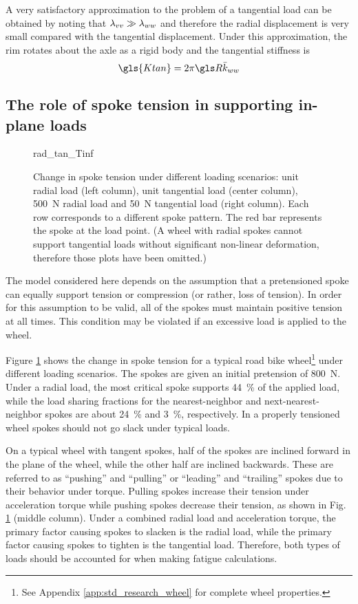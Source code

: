\documentclass[\rootdir/thesis.tex]{subfiles}
\begin{document}
A very satisfactory approximation to the problem of a tangential load can be obtained by noting that $\lambda_{vv}\gg\lambda_{ww}$ and therefore the radial displacement is very small compared with the tangential displacement. Under this approximation, the rim rotates about the axle as a rigid body and the tangential stiffness is
\begin{equation}
\label{eq:Ktan}
\gls{Ktan} = 2\pi\R \kww
\end{equation}

\subsection{The role of spoke tension in supporting in-plane loads}

\begin{figure}
\centering
{rad_tan_Tinf}
\caption{Change in spoke tension under different loading scenarios: unit radial load (left column), unit tangential load (center column), \SI{500}{N} radial load and \SI{50}{N} tangential load (right column). Each row corresponds to a different spoke pattern. The red bar represents the spoke at the load point. (A wheel with radial spokes cannot support tangential loads without significant non-linear deformation, therefore those plots have been omitted.)}
\label{fig:radtan_Tinf}
\end{figure}

The model considered here depends on the assumption that a pretensioned spoke can equally support tension or compression (or rather, loss of tension). In order for this assumption to be valid, all of the spokes must maintain positive tension at all times. This condition may be violated if an excessive load is applied to the wheel.

Figure \ref{fig:radtan_Tinf} shows the change in spoke tension for a typical road bike wheel\footnote{See Appendix \ref{app:std_research_wheel} for complete wheel properties.} under different loading scenarios. The spokes are given an initial pretension of \SI{800}{N}. Under a radial load, the most critical spoke supports \SI{44}{\percent} of the applied load, while the load sharing fractions for the nearest-neighbor and next-nearest-neighbor spokes are about \SI{24}{\percent} and \SI{3}{\percent}, respectively. In a properly tensioned wheel spokes should not go slack under typical loads.

On a typical wheel with tangent spokes, half of the spokes are inclined forward in the plane of the wheel, while the other half are inclined backwards. These are referred to as ``pushing'' and ``pulling'' or ``leading'' and ``trailing'' spokes due to their behavior under torque. Pulling spokes increase their tension under acceleration torque while pushing spokes decrease their tension, as shown in Fig. \ref{fig:radtan_Tinf} (middle column). Under a combined radial load and acceleration torque, the primary factor causing spokes to slacken is the radial load, while the primary factor causing spokes to tighten is the tangential load. Therefore, both types of loads should be accounted for when making fatigue calculations.
\end{document}
